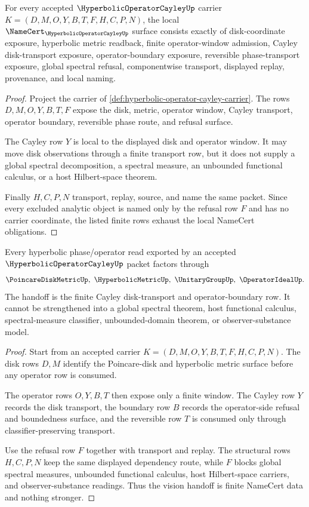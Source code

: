 \begin{theorem}
\label{thm:hyperbolic-operator-cayley-namecert-obligations}
For every accepted $\HyperbolicOperatorCayleyUp$ carrier $K=(D,M,O,Y,B,T,F,H,C,P,N)$, the local $\NameCert_{\HyperbolicOperatorCayleyUp}$ surface consists exactly of disk-coordinate exposure, hyperbolic metric readback, finite operator-window admission, Cayley disk-transport exposure, operator-boundary exposure, reversible phase-transport exposure, global spectral refusal, componentwise transport, displayed replay, provenance, and local naming.
\end{theorem}
\begin{proof}
Project the carrier of \autoref{def:hyperbolic-operator-cayley-carrier}. The rows $D,M,O,Y,B,T,F$ expose the disk, metric, operator window, Cayley transport, operator boundary, reversible phase route, and refusal surface.

The Cayley row $Y$ is local to the displayed disk and operator window. It may move disk observations through a finite transport row, but it does not supply a global spectral decomposition, a spectral measure, an unbounded functional calculus, or a host Hilbert-space theorem.

Finally $H,C,P,N$ transport, replay, source, and name the same packet. Since every excluded analytic object is named only by the refusal row $F$ and has no carrier coordinate, the listed finite rows exhaust the local NameCert obligations.
\end{proof}

\begin{theorem}
\label{thm:hyperbolic-operator-cayley-vision-handoff}
Every hyperbolic phase/operator read exported by an accepted $\HyperbolicOperatorCayleyUp$ packet factors through
$$
\PoincareDiskMetricUp,\ \HyperbolicMetricUp,\ \UnitaryGroupUp,\ \OperatorIdealUp .
$$
The handoff is the finite Cayley disk-transport and operator-boundary row. It cannot be strengthened into a global spectral theorem, host functional calculus, spectral-measure classifier, unbounded-domain theorem, or observer-substance model.
\end{theorem}
\begin{proof}
Start from an accepted carrier $K=(D,M,O,Y,B,T,F,H,C,P,N)$. The disk rows $D,M$ identify the Poincare-disk and hyperbolic metric surface before any operator row is consumed.

The operator rows $O,Y,B,T$ then expose only a finite window. The Cayley row $Y$ records the disk transport, the boundary row $B$ records the operator-side refusal and boundedness surface, and the reversible row $T$ is consumed only through classifier-preserving transport.

Use the refusal row $F$ together with transport and replay. The structural rows $H,C,P,N$ keep the same displayed dependency route, while $F$ blocks global spectral measures, unbounded functional calculus, host Hilbert-space carriers, and observer-substance readings. Thus the vision handoff is finite NameCert data and nothing stronger.
\end{proof}

